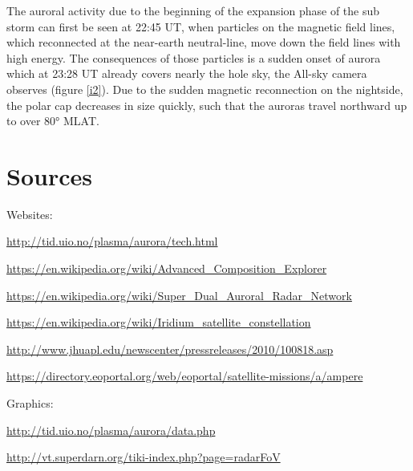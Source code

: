 \documentclass[10pt,a4paper]{article}
\begin{document}

The auroral activity due to the beginning of the expansion phase of the sub storm can first be seen at 22:45 UT, when particles on the magnetic field lines, which reconnected at the near-earth neutral-line, move down the field lines with high energy. The consequences of those particles is a sudden onset of aurora which at 23:28 UT already covers nearly the hole sky, the All-sky camera observes (figure \ref{i2}). Due to the sudden magnetic reconnection on the nightside, the polar cap decreases in size quickly, such that the auroras travel northward up to over 80° MLAT.


\section{Sources}

Websites:

	\url{http://tid.uio.no/plasma/aurora/tech.html}
	
	\url{https://en.wikipedia.org/wiki/Advanced_Composition_Explorer}
	
	\url{https://en.wikipedia.org/wiki/Super_Dual_Auroral_Radar_Network}
	
	\url{https://en.wikipedia.org/wiki/Iridium_satellite_constellation}
	
	\url{http://www.jhuapl.edu/newscenter/pressreleases/2010/100818.asp}
	
	\url{https://directory.eoportal.org/web/eoportal/satellite-missions/a/ampere}
	
Graphics:

	\url{http://tid.uio.no/plasma/aurora/data.php}
	
	\url{http://vt.superdarn.org/tiki-index.php?page=radarFoV}
\end{document}
